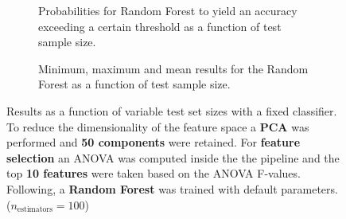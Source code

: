 \begin{figure}
    \captionsetup[subfigure]{justification=justified,singlelinecheck=false}
    \begin{subfigure}[t]{0.61\textwidth}
        
        \caption{Probabilities for Random Forest to yield an accuracy exceeding a certain threshold as a function of test sample size.}
    \end{subfigure}
    \hspace{3.0mm}
    \begin{subfigure}[t]{0.34\textwidth}
        
        \caption{Minimum, maximum and mean results for the Random Forest as a function of test sample size.}
    \end{subfigure}
    \caption[Effects of varying test sample size. Random Forest; Preprocessing: PCA ($n_\text{components} = \num{50}$); ANOVA feature selection ($k_\text{best} = \num{10}$)]{Results as a function of variable test set sizes with a fixed classifier. To reduce the dimensionality of the feature space a \textbf{PCA} was performed and \textbf{\num{50} components} were retained. For \textbf{feature selection} an ANOVA was computed inside the the pipeline and the top \textbf{\num{10} features} were taken based on the ANOVA F-values. Following, a \textbf{{Random Forest}} was trained with default parameters. ($n_\text{estimators}=\num{100}$)}
    \label{fig:PCA_50_components_10_best_selected_RandomForest}
\end{figure}

